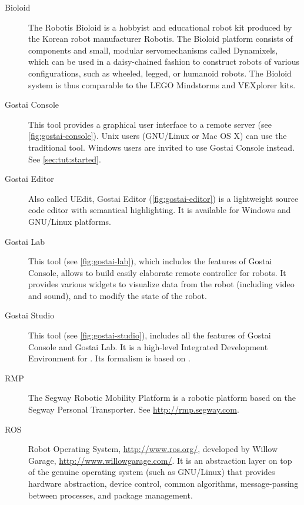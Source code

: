\begin{description}
\item[Bioloid] The Robotis Bioloid is a hobbyist and educational robot kit
  produced by the Korean robot manufacturer Robotis. The Bioloid platform
  consists of components and small, modular servomechanisms called
  Dynamixels, which can be used in a daisy-chained fashion to construct
  robots of various configurations, such as wheeled, legged, or humanoid
  robots. The Bioloid system is thus comparable to the LEGO Mindstorms and
  VEXplorer kits.

\item[Gostai Console] This tool provides a graphical user interface to a
  remote \urbi server (see \autoref{fig:gostai-console}).  Unix users
  (GNU/Linux or Mac OS X) can use the traditional  tool.
  Windows users are invited to use Gostai Console instead.  See
  \autoref{sec:tut:started}.


\item[Gostai Editor] Also called UEdit, Gostai \us Editor
  (\autoref{fig:gostai-editor}) is a lightweight \us source code editor with
  semantical highlighting. It is available for Windows and GNU/Linux
  platforms.


\item[Gostai Lab] This tool (see \autoref{fig:gostai-lab}), which
  includes the features of Gostai Console, allows to build easily
  elaborate remote controller for robots.  It provides various widgets
  to visualize data from the robot (including video and sound), and to
  modify the state of the robot.


\item[Gostai Studio] This tool (see \autoref{fig:gostai-studio}),
  includes all the features of Gostai Console and Gostai Lab.  It is a
  high-level Integrated Development Environment for \urbi.  Its
  formalism is based on .


\item[RMP] The Segway Robotic Mobility Platform is a robotic platform based
  on the Segway Personal Transporter.  See \url{http://rmp.segway.com}.

\item[ROS] Robot Operating System, \url{http://www.ros.org/}, developed by
  Willow Garage, \url{http://www.willowgarage.com/}.  It is an abstraction
  layer on top of the genuine operating system (such as GNU/Linux) that
  provides hardware abstraction, device control, common algorithms,
  message-passing between processes, and package management.


\end{description}
